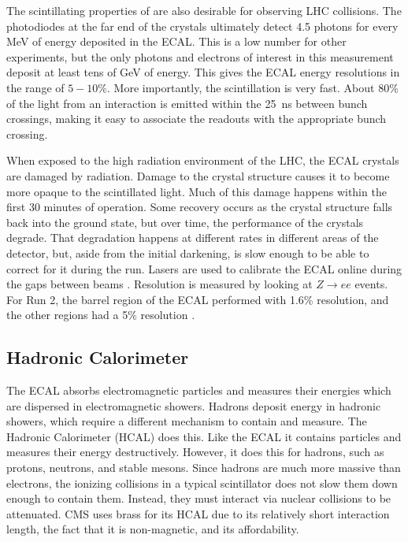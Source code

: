 The scintillating properties of  are also desirable for observing LHC collisions.
The photodiodes at the far end of the crystals
ultimately detect 4.5 photons for every MeV of energy deposited in the ECAL.
This is a low number for other experiments, but the only photons and electrons of
interest in this measurement deposit at least tens of GeV of energy.
This gives the ECAL energy resolutions in the range of $5-10\%$.
More importantly, the scintillation is very fast.
About 80\% of the light from an interaction is emitted within
the \SI{25}{ns} between bunch crossings,
making it easy to associate the readouts with the appropriate bunch crossing.

When exposed to the high radiation environment of the LHC,
the ECAL crystals are damaged by radiation.
Damage to the crystal structure causes it to become more opaque to the scintillated light.
Much of this damage happens within the first 30 minutes of operation.
Some recovery occurs as the crystal structure falls back into the ground state,
but over time, the performance of the crystals degrade.
That degradation happens at different rates in different areas of the detector,
but, aside from the initial darkening,
is slow enough to be able to correct for it during the run.
Lasers are used to calibrate the ECAL online during
the gaps between beams \cite{Monti:2653861}.
Resolution is measured by looking at $Z\rightarrow ee$ events.
For Run 2, the barrel region of the ECAL performed with 1.6\% resolution,
and the other regions had a 5\% resolution \cite{Bartosik:2712238}.

\subsection{Hadronic Calorimeter}

The ECAL absorbs electromagnetic particles and measures their energies
which are dispersed in electromagnetic showers. 
Hadrons deposit energy in hadronic showers,
which require a different mechanism to contain and measure.
The Hadronic Calorimeter (HCAL) does this.
Like the ECAL it contains particles and measures their energy destructively.
However, it does this for hadrons, such as protons, neutrons, and stable mesons.
Since hadrons are much more massive than electrons,
the ionizing collisions in a typical scintillator does not slow them down
enough to contain them.
Instead, they must interact via nuclear collisions to be attenuated.
CMS uses brass for its HCAL due to its relatively short interaction length,
the fact that it is non-magnetic, and its affordability.

